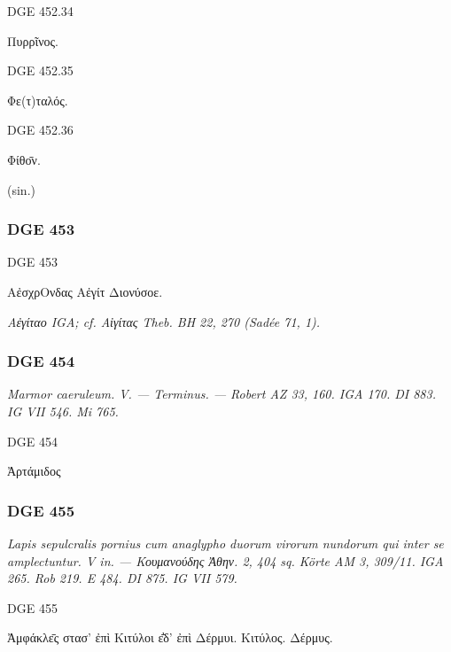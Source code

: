 \begin{versi}{DGE 452.34}
\begin{greek}
Πυρρῖνος.
\end{greek}
\end{versi}

\begin{versi}{DGE 452.35}
\begin{greek}
Φε(τ)ταλός.
\end{greek}
\end{versi}

\begin{versi}{DGE 452.36}
\begin{greek}
Φίθο̄ν.
\end{greek}
(sin.)
\end{versi}

\hrulefill

\subsubsection{DGE 453}
\begin{versi}{DGE 453}
\begin{greek}
ΑἐσχρΟνδας Αἐγίτ {\verso[1]} Διονύσοε.
\end{greek}
\end{versi}
\textit{\textgreek{Αἐγίτ{\lbrk}αο} IGA; cf. \textit{Αἰγίτας} Theb. BH 22, 270 (Sadée 71, 1).}

\hrulefill

\subsubsection{DGE 454}
\textit{Marmor caeruleum. V. — Terminus. — Robert AZ 33, 160. IGA 170. DI 883. IG VII 546. Mi 765.}
\begin{versi}{DGE 454}
\begin{greek}
Ἀρτάμι{\verso}δος
\end{greek}
\end{versi}

\hrulefill

\subsubsection{DGE 455}
\textit{Lapis sepulcralis pornius cum anaglypho duorum virorum nundorum qui inter se amplectuntur. V in. — Κουμανούδης Ἀθην. 2, 404 sq. Körte AM 3, 309/11. IGA 265. Rob 219. E 484. DI 875. IG VII 579.}
\begin{versi}{DGE 455}
\begin{greek}
Ἀμφάκλε̄ς στασ’ ἐπὶ Κιτύλοι ε̄̓{\verso[1]}δ’ ἐπὶ Δέρμυι. {\verso} Κιτύλος. {\verso} Δέρμυς.
\end{greek}
\end{versi}

